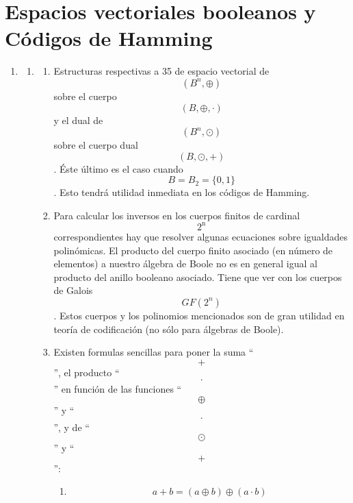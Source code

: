 \chapter{Espacios vectoriales booleanos y Códigos de Hamming}

\begin{enumerate}
\def\labelenumi{\arabic{enumi}.}
\item
  \begin{enumerate}
  \def\labelenumii{\arabic{enumii}.}
  \item
    \begin{enumerate}
    \def\labelenumiii{\arabic{enumiii}.}
    \item
      Estructuras respectivas a 35 de espacio vectorial
      de\[({B^{n}, \oplus})\]sobre el cuerpo \[({B, \oplus , \cdot})\] y
      el dual de \[({B^{n}, \odot})\]sobre el cuerpo dual
      \[({B, \odot , +})\]. Éste último es el caso cuando
      \[{B = B_{2}} = {\{ 0,1\}}\]. Esto tendrá utilidad inmediata en
      los códigos de Hamming.
    \item
      Para calcular los inversos en los cuerpos finitos de cardinal
      \[2^{\mathbf{\mathrm{n}}}\] correspondientes hay que re\-solver
      algunas ecuaciones sobre igualdades polinómicas. El producto del
      cuerpo fi\-nito asociado (en número de elementos) a nuestro
      álgebra de Boole no es en general igual al producto del ani\-llo
      booleano asociado. Tiene que ver con los cuerpos de Galois
      \[\mathit{GF}{(2^{n})}\]. Estos cuerpos y los polinomios
      mencionados son de gran utilidad en teoría de codificación (no
      sólo para álgebras de Boole).
    \item
      Existen formulas sencillas para poner la suma ``\[+\]'', el
      producto ``\[\cdot\]'' en fun\-ción de las funciones
      ``\[\oplus\]'' y ``\[\cdot\]'', y de ``\[\odot\]'' y ``\[+\]'':

      \begin{enumerate}
      \def\labelenumiv{\arabic{enumiv}.}
      \item
        \[{{a + b} = {({a \oplus b})}} \oplus {({a \cdot b})}\]


\end{enumerate}
\end{enumerate}
\end{enumerate}
\end{enumerate}
